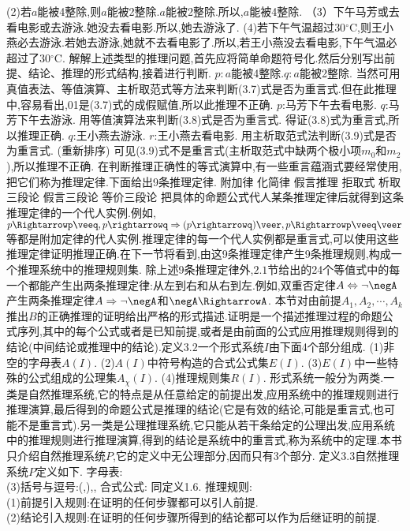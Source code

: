 {(2)若$a$能被4整除,则$a$能被2整除.$a$能被2整除.所以,$a$能被4整除.
（3）下午马芳或去看电影或去游泳.她没去看电影.所以,她去游泳了.
(4)若下午气温超过$30{}^{\circ}\mathrm{C}$,则王小燕必去游泳.若她去游泳,她就不去看电影了.所以,若王小燕没去看电影,下午气温必超过了$30{}^{\circ}\mathrm{C}$.
解解上述类型的推理问题,首先应将简单命题符号化.然后分别写出前提、结论、推理的形式结构,接着进行判断.
$p:a$能被4整除.$q:a$能被2整除.
当然可用真值表法、等值演算、主析取范式等方法来判断(3.7)式是否为重言式.但在此推理中,容易看出,01是(3.7)式的成假赋值,所以此推理不正确.
$p$:马芳下午去看电影.
$q$:马芳下午去游泳.
用等值演算法来判断(3.8)式是否为重言式.
得证(3.8)式为重言式,所以推理正确.
$q$:王小燕去游泳.
$r$:王小燕去看电影.
用主析取范式法判断(3.9)式是否为重言式.
{(重新排序)}
可见(3.9)式不是重言式(主析取范式中缺两个极小项$m_{0}$和$m_{2}$),所以推理不正确.
在判断推理正确性的等式演算中,有一些重言蕴涵式要经常使用,把它们称为推理定律.下面给出9条推理定律.
附加律
化简律
假言推理
拒取式
析取三段论
假言三段论
等价三段论
把具体的命题公式代人某条推理定律后就得到这条推理定律的一个代人实例.例如,$p\Rightarrowp\veeq,p\rightarrowq\Rightarrow(p\rightarrowq)\veer,p\Rightarrowp\veeq\veer$等都是附加定律的代人实例.推理定律的每一个代人实例都是重言式,可以使用这些推理定律证明推理正确.在下一节将看到,由这9条推理定律产生9条推理规则,构成一个推理系统中的推理规则集.
除上述9条推理定律外,$2.1$节给出的24个等值式中的每一个都能产生出两条推理定律:从左到右和从右到左.例如,双重否定律$A\Leftrightarrow\neg\negA$产生两条推理定律$A\Rightarrow\neg\negA$和$\negA\RightarrowA$.
本节对由前提$A_{1},A_{2},\cdots,A_{k}$推出$B$的正确推理的证明给出严格的形式描述.证明是一个描述推理过程的命题公式序列,其中的每个公式或者是已知前提,或者是由前面的公式应用推理规则得到的结论(中间结论或推理中的结论).定义$3.2$一个形式系统$I$由下面4个部分组成.
(1)非空的字母表$A(I)$.
(2)$A(I)$中符号构造的合式公式集$E(I)$.
(3)$E(I)$中一些特殊的公式组成的公理集$A_{\chi}(I)$.
(4)推理规则集$R(I)$.
形式系统一般分为两类.一类是自然推理系统,它的特点是从任意给定的前提出发,应用系统中的推理规则进行推理演算,最后得到的命题公式是推理的结论(它是有效的结论,可能是重言式,也可能不是重言式).另一类是公理推理系统,它只能从若干条给定的公理出发,应用系统中的推理规则进行推理演算,得到的结论是系统中的重言式,称为系统中的定理.本书只介绍自然推理系统$P$,它的定义中无公理部分,因而只有3个部分.
定义$3.3$自然推理系统$P$定义如下.
字母表:\\
(3)括号与逗号:(,),,
合式公式:
同定义1.6.
推理规则:\\
(1)前提引入规则:在证明的任何步骤都可以引人前提.\\
(2)结论引入规则:在证明的任何步骤所得到的结论都可以作为后继证明的前提.\\
}
